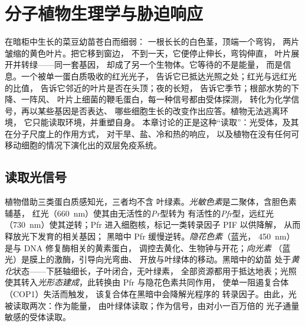 \chapter{分子植物生理学与胁迫响应}\label{ch:b3:plant-molecular-physiology}

在暗柜中生长的菜豆幼苗苍白而细弱：
一根长长的白色茎，顶端一个弯钩，
两片皱缩的黄色叶片。把它移到窗边，
不到一天，它便停止伸长，弯钩伸直，
叶片展开并转绿——同一套基因，
却成了另一个生物体。它等待的不是能量，
而是信息。一个被单一蛋白质吸收的红光光子，
告诉它已抵达光照之处；红光与远红光的比值，
告诉它邻近的叶片是否在头顶；夜的长短，
告诉它季节；根部水势的下降、一阵风、
叶片上细菌的鞭毛蛋白，每一种信号都由受体探测，
转化为化学信号，再以某些基因是否表达、
哪些细胞生长的改变作出应答。植物无法逃离环境，
它只能读取环境，并重塑自身。
本章讨论的正是这种“读取”：光受体，及其在分子尺度上的作用方式，
对干旱、盐、冷和热的响应，
以及植物在没有任何可移动细胞的情况下演化出的双层免疫系统。

\section{读取光信号}

\begin{definition}[光受体]\label{def:b3:plant-molecular-physiology:photoreceptors}
植物借助三类蛋白质感知光，三者均不含
叶绿素。\emph{光敏色素}是二聚体，含胆色素辅基，
红光（\qty{660}{nm}）使其由无活性的\emph{Pr}型转为
有活性的\emph{Pfr}型，远红光（\qty{730}{nm}）使其逆转；Pfr
进入细胞核，标记一类转录因子 PIF 以供降解，
从而释放光下发育的相关基因；
黑暗中 Pfr 缓慢逆转。\emph{隐花色素}（蓝光，
\qty{450}{nm}）是与 DNA 修复酶相关的黄素蛋白，
调控去黄化、生物钟与开花；\emph{向光素}
（蓝光）是膜上的激酶，引导向光弯曲、
开放与叶绿体的移动。黑暗中的幼苗
处于\emph{黄化}状态——下胚轴细长，子叶闭合，无叶绿素，
全部资源都用于抵达地表；光照
使其转入\emph{光形态建成}，此转换由 Pfr 与隐花色素共同作用，
使单一阻遏复合体（COP1）失活而触发，
该复合体在黑暗中会降解光程序的
转录因子。由此，光被读取两次：作为能量，
由叶绿体读取；作为信号，由对小一百万倍的
光子通量敏感的受体读取。
\end{definition}

